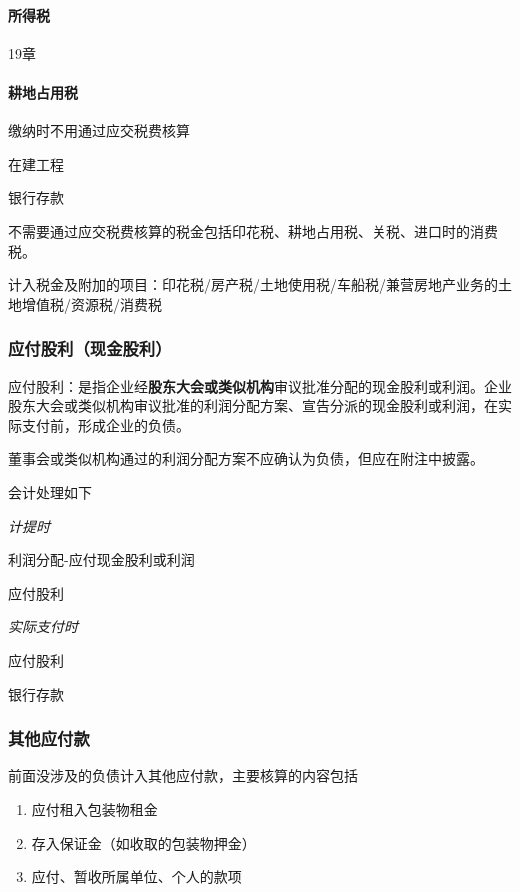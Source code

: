 \documentclass[UTF8,12pt]{ctexart}
\newenvironment{Dr}{%
	\begin{list}{}%
		{
			\setlength{\leftmargin}{2em}
			\setlength{\labelwidth}{2em}
			\setlength{\labelsep}{0pt}
			\setlength{\itemindent}{0pt}
			\setlength{\listparindent}{0pt}
			\setlength{\parsep}{0pt}
			\setlength{\topsep}{0pt}
		}
		\item[\textbf{借：}]
	}{%
	\end{list}
}
\newenvironment{Cr}{%
	\begin{list}{}%
		{
			\setlength{\leftmargin}{3em}
			\setlength{\labelwidth}{2em}
			\setlength{\labelsep}{0pt}
			\setlength{\itemindent}{0pt}
			\setlength{\listparindent}{0pt}
			\setlength{\parsep}{0pt}
			\setlength{\topsep}{0pt}
		}
		\item[\textbf{贷：}]
	}{%
	\end{list}
}
\numberwithin{equation}{section} %
\numberwithin{figure}{section}
\numberwithin{table}{section}
\begin{document}
	\paragraph{所得税}
	19章
	
	\paragraph{耕地占用税}
	缴纳时不用通过应交税费核算
	
	\begin{Dr}
		在建工程
	\end{Dr}
	\begin{Cr}
		银行存款
	\end{Cr}

	不需要通过应交税费核算的税金包括印花税、耕地占用税、关税、进口时的消费税。
	
	计入税金及附加的项目：印花税/房产税/土地使用税/车船税/兼营房地产业务的土地增值税/资源税/消费税
	
	\subsubsection{应付股利（现金股利）}
	应付股利：是指企业经\textbf{股东大会或类似机构}审议批准分配的现金股利或利润。企业股东大会或类似机构审议批准的利润分配方案、宣告分派的现金股利或利润，在实际支付前，形成企业的负债。
	
	董事会或类似机构通过的利润分配方案不应确认为负债，但应在附注中披露。
	
	会计处理如下
	
	\textit{计提时}
	
	\begin{Dr}
		利润分配-应付现金股利或利润
	\end{Dr}
	\begin{Cr}
		应付股利
	\end{Cr}

	\textit{实际支付时}
	
	\begin{Dr}
		应付股利
	\end{Dr}
	\begin{Cr}
		银行存款
	\end{Cr}
	
	\subsubsection{其他应付款}
	前面没涉及的负债计入其他应付款，主要核算的内容包括
	\begin{enumerate}
		\item 应付租入包装物租金
		
		\item 存入保证金（如收取的包装物押金）
		
		\item 应付、暂收所属单位、个人的款项
	\end{enumerate}
	
\end{document}

